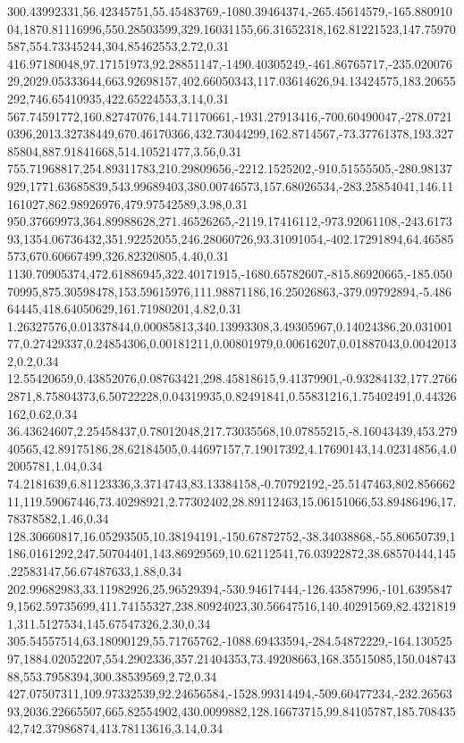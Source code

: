 300.43992331,56.42345751,55.45483769,-1080.39464374,-265.45614579,-165.88091004,1870.81116996,550.28503599,329.16031155,66.31652318,162.81221523,147.75970587,554.73345244,304.85462553,2.72,0.31
416.97180048,97.17151973,92.28851147,-1490.40305249,-461.86765717,-235.02007629,2029.05333644,663.92698157,402.66050343,117.03614626,94.13424575,183.20655292,746.65410935,422.65224553,3.14,0.31
567.74591772,160.82747076,144.71170661,-1931.27913416,-700.60490047,-278.07210396,2013.32738449,670.46170366,432.73044299,162.8714567,-73.37761378,193.32785804,887.91841668,514.10521477,3.56,0.31
755.71968817,254.89311783,210.29809656,-2212.1525202,-910.51555505,-280.98137929,1771.63685839,543.99689403,380.00746573,157.68026534,-283.25854041,146.11161027,862.98926976,479.97542589,3.98,0.31
950.37669973,364.89988628,271.46526265,-2119.17416112,-973.92061108,-243.617393,1354.06736432,351.92252055,246.28060726,93.31091054,-402.17291894,64.46585573,670.60667499,326.82320805,4.40,0.31
1130.70905374,472.61886945,322.40171915,-1680.65782607,-815.86920665,-185.05070995,875.30598478,153.59615976,111.98871186,16.25026863,-379.09792894,-5.48664445,418.64050629,161.71980201,4.82,0.31
1.26327576,0.01337844,0.00085813,340.13993308,3.49305967,0.14024386,20.03100177,0.27429337,0.24854306,0.00181211,0.00801979,0.00616207,0.01887043,0.00420132,0.2,0.34
12.55420659,0.43852076,0.08763421,298.45818615,9.41379901,-0.93284132,177.27662871,8.75804373,6.50722228,0.04319935,0.82491841,0.55831216,1.75402491,0.44326162,0.62,0.34
36.43624607,2.25458437,0.78012048,217.73035568,10.07855215,-8.16043439,453.27940565,42.89175186,28.62184505,0.44697157,7.19017392,4.17690143,14.02314856,4.02005781,1.04,0.34
74.2181639,6.81123336,3.3714743,83.13384158,-0.70792192,-25.5147463,802.85666211,119.59067446,73.40298921,2.77302402,28.89112463,15.06151066,53.89486496,17.78378582,1.46,0.34
128.30660817,16.05293505,10.38194191,-150.67872752,-38.34038868,-55.80650739,1186.0161292,247.50704401,143.86929569,10.62112541,76.03922872,38.68570444,145.22583147,56.67487633,1.88,0.34
202.99682983,33.11982926,25.96529394,-530.94617444,-126.43587996,-101.63958479,1562.59735699,411.74155327,238.80924023,30.56647516,140.40291569,82.43218191,311.5127534,145.67547326,2.30,0.34
305.54557514,63.18090129,55.71765762,-1088.69433594,-284.54872229,-164.13052597,1884.02052207,554.2902336,357.21404353,73.49208663,168.35515085,150.04874388,553.7958394,300.38539569,2.72,0.34
427.07507311,109.97332539,92.24656584,-1528.99314494,-509.60477234,-232.2656393,2036.22665507,665.82554902,430.0099882,128.16673715,99.84105787,185.70843542,742.37986874,413.78113616,3.14,0.34
